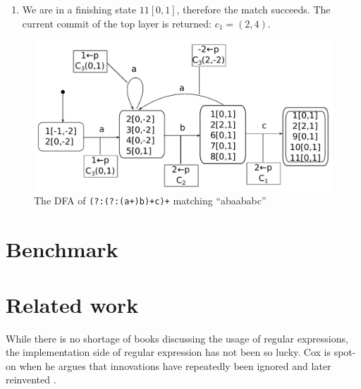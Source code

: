 \documentclass[english]{sigplanconf}
\theoremstyle{definition}
\begin{document}
\begin{enumerate}
\begin{enumerate}
\item We are in a finishing state $11[0,1]$, therefore the match succeeds.
The current commit of the top layer is returned: $c_{1}=(2,4)$.
\end{enumerate}
\end{enumerate}
\begin{figure}
\includegraphics[width=\linewidth]{graphs/abc-dfa}

\caption{\label{fig:lazy-dfa}The DFA of \texttt{(?:(?:(a+)b)+c)+} matching
``abaababc''}


\end{figure}

\section{Benchmark}


\section{Related work}

While there is no shortage of books discussing the usage of regular
expressions, the implementation side of regular expression has not
been so lucky. Cox is spot-on when he argues that innovations have
repeatedly been ignored and later reinvented \cite{Cox2007}. 
\end{document}
